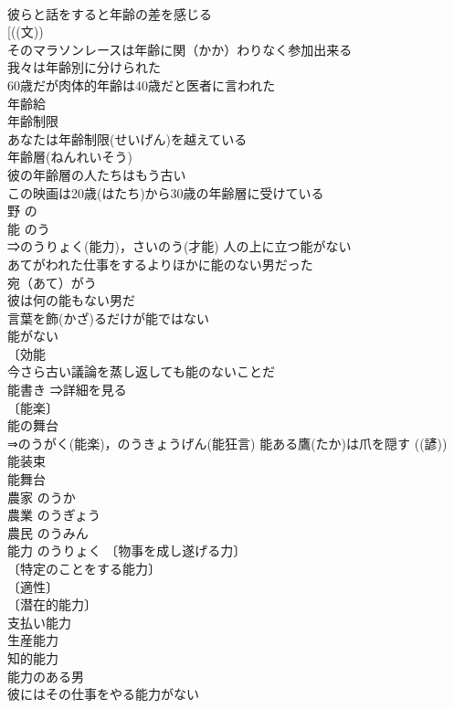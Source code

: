 \documentclass[8pt]{extreport}
\begin{document}
\begin{CJK}{UTF8}{min}
\\	彼らと話をすると年齢の差を感じる 
\\	[((文)) 
\\	そのマラソンレースは年齢に関（かか）わりなく参加出来る 
\\	我々は年齢別に分けられた 
\\	60歳だが肉体的年齢は40歳だと医者に言われた 
\\	年齢給 
\\	年齢制限 
\\	あなたは年齢制限(せいげん)を越えている 
\\	年齢層(ねんれいそう) 
\\	彼の年齢層の人たちはもう古い 
\\	この映画は20歳(はたち)から30歳の年齢層に受けている 
\\	野	の	
\\	能	のう 
\\	⇒のうりょく(能力)，さいのう(才能) 人の上に立つ能がない 
\\	あてがわれた仕事をするよりほかに能のない男だった 
\\	宛（あて）がう　
\\	彼は何の能もない男だ 
\\	言葉を飾(かざ)るだけが能ではない 
\\	能がない　
\\	〔効能　
\\	今さら古い議論を蒸し返しても能のないことだ 
\\	能書き ⇒詳細を見る 
\\	〔能楽〕
\\	能の舞台 
\\	⇒のうがく(能楽)，のうきょうげん(能狂言) 能ある鷹(たか)は爪を隠す ((諺)) 
\\	能装束 
\\	能舞台 
\\	農家	のうか	
\\	農業	のうぎょう	
\\	農民	のうみん	
\\	能力	のうりょく	〔物事を成し遂げる力〕
\\	〔特定のことをする能力〕
\\	〔適性〕
\\	〔潜在的能力〕
\\	支払い能力 
\\	生産能力 
\\	知的能力 
\\	能力のある男 
\\	彼にはその仕事をやる能力がない 

\end{CJK}
\end{document}
